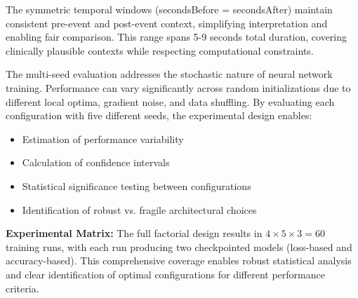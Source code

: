 The symmetric temporal windows (secondsBefore = secondsAfter) maintain consistent pre-event and post-event context, simplifying interpretation and enabling fair comparison. This range spans 5-9 seconds total duration, covering clinically plausible contexts while respecting computational constraints.

The multi-seed evaluation addresses the stochastic nature of neural network training. Performance can vary significantly across random initializations due to different local optima, gradient noise, and data shuffling. By evaluating each configuration with five different seeds, the experimental design enables:
\begin{itemize}
    \item Estimation of performance variability
    \item Calculation of confidence intervals
    \item Statistical significance testing between configurations
    \item Identification of robust vs. fragile architectural choices
\end{itemize}

\textbf{Experimental Matrix:} The full factorial design results in $4 \times 5 \times 3 = 60$ training runs, with each run producing two checkpointed models (loss-based and accuracy-based). This comprehensive coverage enables robust statistical analysis and clear identification of optimal configurations for different performance criteria.
